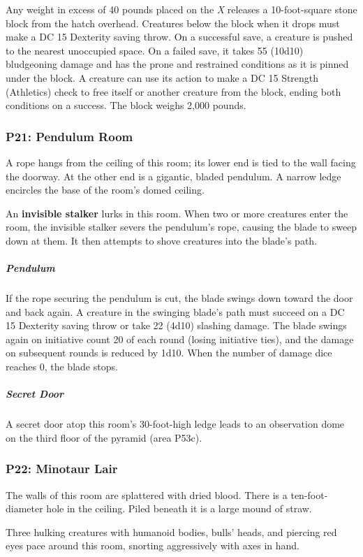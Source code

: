 \documentclass[10pt,a4paper,twoside,bg=print,twocolumn,openany,nodeprecatedcode]{dndbook}
\begin{document}
Any weight in excess of 40 pounds placed on the \textit{X} releases a 10-foot-square stone block from the hatch overhead. Creatures below the block when it drops must make a DC 15 Dexterity saving throw. On a successful save, a creature is pushed to the nearest unoccupied space. On a failed save, it takes 55 (10d10) bludgeoning damage and has the prone and restrained conditions as it is pinned under the block. A creature can use its action to make a DC 15 Strength (Athletics) check to free itself or another creature from the block, ending both conditions on a success. The block weighs 2,000 pounds.

\subsubsection{P21: Pendulum Room}
\begin{DndReadAloud}{}
A rope hangs from the ceiling of this room; its lower end is tied to the wall facing the doorway. At the other end is a gigantic, bladed pendulum. A narrow ledge encircles the base of the room's domed ceiling.

\end{DndReadAloud}

An \textbf{invisible stalker} lurks in this room. When two or more creatures enter the room, the invisible stalker severs the pendulum's rope, causing the blade to sweep down at them. It then attempts to shove creatures into the blade's path.

\subparagraph{Pendulum}
If the rope securing the pendulum is cut, the blade swings down toward the door and back again. A creature in the swinging blade's path must succeed on a DC 15 Dexterity saving throw or take 22 (4d10) slashing damage. The blade swings again on initiative count 20 of each round (losing initiative ties), and the damage on subsequent rounds is reduced by 1d10. When the number of damage dice reaches 0, the blade stops.

\subparagraph{Secret Door}
A secret door atop this room's 30-foot-high ledge leads to an observation dome on the third floor of the pyramid (area P53c).

\subsubsection{P22: Minotaur Lair}
\begin{DndReadAloud}{}
The walls of this room are splattered with dried blood. There is a ten-foot-diameter hole in the ceiling. Piled beneath it is a large mound of straw.

Three hulking creatures with humanoid bodies, bulls' heads, and piercing red eyes pace around this room, snorting aggressively with axes in hand.

\end{DndReadAloud}
\end{document}

